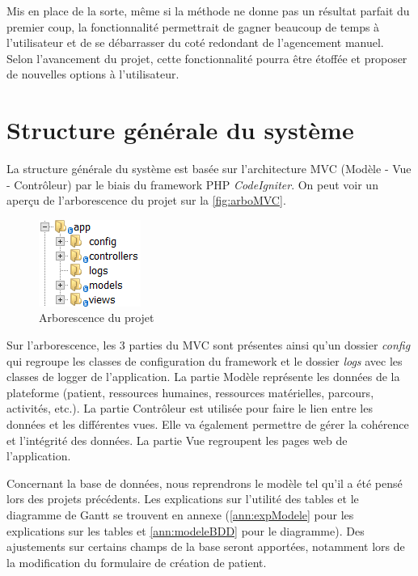 \documentclass{polytech/polytech}
\begin{document}
Mis en place de la sorte, même si la méthode ne donne pas un résultat parfait du premier coup, la fonctionnalité permettrait de gagner beaucoup de temps à l'utilisateur et de se débarrasser du coté redondant de l'agencement manuel. Selon l'avancement du projet, cette fonctionnalité pourra être étoffée et proposer de nouvelles options à l'utilisateur.


\section{Structure générale du système}
\label{sec:structure}

La structure générale du système est basée sur l'architecture MVC (Modèle - Vue - Contrôleur) par le biais du framework PHP \textit{CodeIgniter}. On peut voir un aperçu de l'arborescence du projet sur la \autoref{fig:arboMVC}. 

\begin{figure}
	\includegraphics[scale=1]{images/arboMVC}
	\caption{Arborescence du projet}
	\label{fig:arboMVC}
\end{figure}

Sur l'arborescence, les 3 parties du MVC sont présentes ainsi qu'un dossier \textit{config} qui regroupe les classes de configuration du framework et le dossier \textit{logs} avec les classes de logger de l'application. La partie Modèle représente les données de la plateforme (patient, ressources humaines, ressources matérielles, parcours, activités, etc.). La partie Contrôleur est utilisée pour faire le lien entre les données et les différentes vues. Elle va également permettre de gérer la cohérence et l'intégrité des données. La partie Vue regroupent les pages web de l'application. 

Concernant la base de données, nous reprendrons le modèle tel qu'il a été pensé lors des projets précédents. Les explications sur l'utilité des tables et le diagramme de Gantt se trouvent en annexe (\autoref{ann:expModele} pour les explications sur les tables et \autoref{ann:modeleBDD} pour le diagramme). Des ajustements sur certains champs de la base seront apportées, notamment lors de la modification du formulaire de création de patient. 
\end{document}
